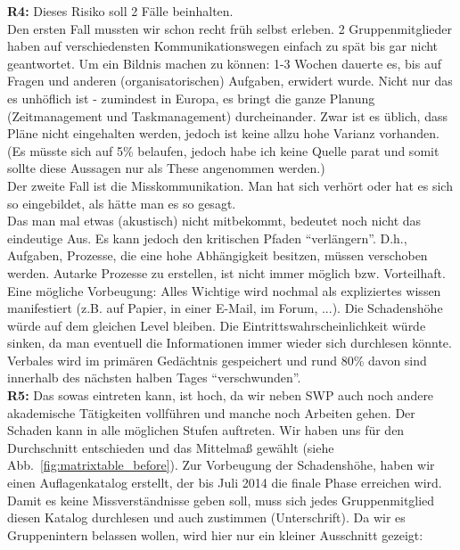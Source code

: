 \documentclass[fontsize=12pt,paper=a4,twoside]{scrartcl}
\begin{document}
\textbf{R4:} Dieses Risiko soll 2 Fälle beinhalten.\\ Den ersten Fall mussten wir schon recht früh selbst erleben. 2 Gruppenmitglieder haben auf verschiedensten Kommunikationswegen einfach zu spät bis gar nicht geantwortet. Um ein Bildnis machen zu können: 1-3 Wochen dauerte es, bis auf Fragen und anderen (organisatorischen) Aufgaben, erwidert wurde. Nicht nur das es unhöflich ist - zumindest in Europa, es bringt die ganze Planung (Zeitmanagement und Taskmanagement) durcheinander. Zwar ist es üblich, dass Pläne nicht eingehalten werden, jedoch ist keine allzu hohe Varianz vorhanden. (Es müsste sich auf 5\% belaufen, jedoch habe ich keine Quelle parat und somit sollte diese Aussagen nur als These angenommen werden.)\\
Der zweite Fall ist die Misskommunikation. Man hat sich verhört oder hat es sich so eingebildet, als hätte man es so gesagt.\\
Das man mal etwas (akustisch) nicht mitbekommt, bedeutet noch nicht das eindeutige Aus. Es kann jedoch den kritischen Pfaden "`verlängern"'. D.h., Aufgaben, Prozesse, die eine hohe Abhängigkeit besitzen, müssen verschoben werden. Autarke Prozesse zu erstellen, ist nicht immer möglich bzw. Vorteilhaft.\\
Eine mögliche Vorbeugung: Alles Wichtige wird nochmal als expliziertes wissen manifestiert (z.B. auf Papier, in einer E-Mail, im Forum, ...). Die Schadenshöhe würde auf dem gleichen Level bleiben. Die Eintrittswahrscheinlichkeit würde sinken, da man eventuell die Informationen immer wieder sich durchlesen könnte. Verbales wird im primären Gedächtnis gespeichert und rund 80\% davon sind innerhalb des nächsten halben Tages "`verschwunden"'.\\ 


\textbf{R5:} Das sowas eintreten kann, ist hoch, da wir neben SWP auch noch andere akademische Tätigkeiten vollführen und manche noch Arbeiten gehen. Der Schaden kann in alle möglichen Stufen auftreten. Wir haben uns für den Durchschnitt entschieden und das Mittelmaß gewählt (siehe Abb.~\ref{fig:matrixtable_before}).
Zur Vorbeugung der Schadenshöhe, haben wir einen Auflagenkatalog erstellt, der bis Juli 2014 die finale Phase erreichen wird. Damit es keine Missverständnisse geben soll, muss sich jedes Gruppenmitglied diesen Katalog durchlesen und auch zustimmen (Unterschrift). Da wir es Gruppenintern belassen wollen, wird hier nur ein kleiner Ausschnitt gezeigt:\\
\end{document}
